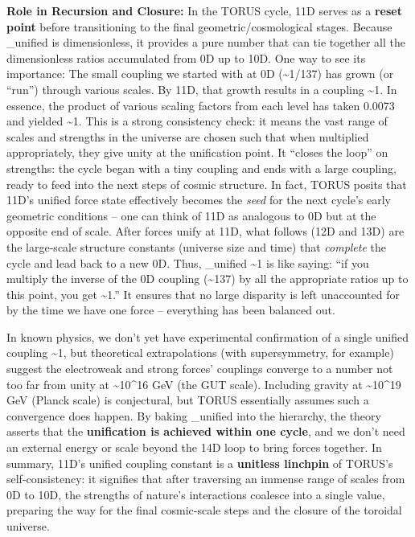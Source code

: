 \documentclass[
]{article}
\begin{document}
{\textbf{Role in Recursion and Closure:} In the TORUS cycle, 11D serves
as a \textbf{reset point} before transitioning to the final
geometric/cosmological stages. Because \alpha\_unified is dimensionless, it
provides a pure number that can tie together all the dimensionless
ratios accumulated from 0D up to 10D. One way to see its importance: The
small coupling we started with at 0D (\alpha \textasciitilde1/137) has grown
(or ``run'') through various scales. By 11D, that growth results in a
coupling \textasciitilde1. In essence, the product of various scaling
factors from each level has taken 0.0073 and yielded
\textasciitilde1\hspace{0pt}. This is a strong consistency check: it
means the vast range of scales and strengths in the universe are chosen
such that when multiplied appropriately, they give unity at the
unification point. It ``closes the loop'' on strengths: the cycle began
with a tiny coupling and ends with a large coupling, ready to feed into
the next steps of cosmic structure\hspace{0pt}. In fact, TORUS posits
that 11D's unified force state effectively becomes the \emph{seed} for
the next cycle's early geometric conditions -- one can think of 11D as
analogous to 0D but at the opposite end of scale\hspace{0pt}. After
forces unify at 11D, what follows (12D and 13D) are the large-scale
structure constants (universe size and time) that \emph{complete} the
cycle and lead back to a new 0D. Thus, \alpha\_unified \textasciitilde1 is
like saying: ``if you multiply the inverse of the 0D coupling
(\textasciitilde137) by all the appropriate ratios up to this point, you
get \textasciitilde1.'' It ensures that no large disparity is left
unaccounted for by the time we have one force -- everything has been
balanced out.

In known physics, we don't yet have experimental confirmation of a
single unified coupling \textasciitilde1, but theoretical extrapolations
(with supersymmetry, for example) suggest the electroweak and strong
forces' couplings converge to a number not too far from unity at
\textasciitilde10\^{}16 GeV (the GUT scale)\hspace{0pt}. Including
gravity at \textasciitilde10\^{}19 GeV (Planck scale) is conjectural,
but TORUS essentially assumes such a convergence does happen. By baking
\alpha\_unified  into the hierarchy, the theory asserts that the
\textbf{unification is achieved within one cycle}, and we don't need an
external energy or scale beyond the 14D loop to bring forces together.
In summary, 11D's unified coupling constant is a \textbf{unitless
linchpin} of TORUS's self-consistency: it signifies that after
traversing an immense range of scales from 0D to 10D, the strengths of
nature's interactions coalesce into a single value, preparing the way
for the final cosmic-scale steps and the closure of the toroidal
universe.

}
\end{document}
